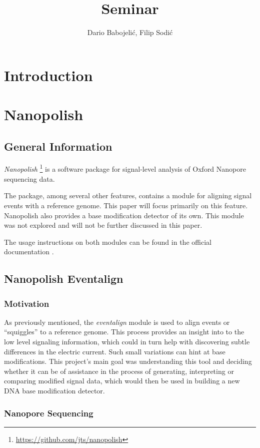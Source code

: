 \documentclass[times, utf, seminar]{fer}
\title{Seminar}
\author{Dario Babojelić, Filip Sodić}
\begin{document}
\maketitle
\tableofcontents
\newpage
\chapter{Introduction}


\chapter{Nanopolish}

\section{General Information}
\emph{Nanopolish}
\footnote{\url{https://github.com/jts/nanopolish}}
is a software package for signal-level analysis of Oxford Nanopore sequencing data.


The package, among several other features, contains a module for aligning signal events with a reference genome. This paper will focus primarily on this feature. Nanopolish also provides a base modification detector of its own. This module was not explored and will not be further discussed in this paper.

The usage instructions on both modules can be found in the official documentation \citep{nanopolish}.

\section{Nanopolish Eventalign}

\subsection{Motivation}
As previously mentioned, the \emph{eventalign} module is used to align events or “squiggles” to a reference genome. This process provides an insight into to the low
level signaling information, which could in turn help with discovering subtle differences in
the electric current. Such small variations can hint at base modifications. This project's main goal was understanding this tool and deciding whether it can be of assistance in the process of generating, interpreting or comparing modified signal data, which would then be used in building a new DNA base modification detector.

\subsection{Nanopore Sequencing}\label{sequencing}
\end{document}

